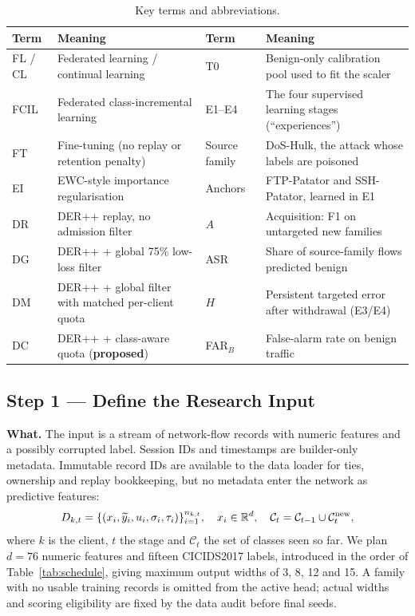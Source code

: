 \documentclass[10pt,a4paper]{article}
\begin{document}
\begin{table}[H]
\centering\footnotesize
\caption{Key terms and abbreviations.}
\label{tab:terms}
\begin{tabularx}{\linewidth}{L{2.2cm}Y L{2.2cm}Y}
\toprule
Term & Meaning & Term & Meaning\\
\midrule
FL / CL & Federated learning / continual learning & T0 & Benign-only calibration pool used to fit the scaler\\
FCIL & Federated class-incremental learning & E1--E4 & The four supervised learning stages (\enquote{experiences})\\
FT & Fine-tuning (no replay or retention penalty) & Source family & DoS-Hulk, the attack whose labels are poisoned\\
EI & EWC-style importance regularisation & Anchors & FTP-Patator and SSH-Patator, learned in E1\\
DR & DER++ replay, no admission filter & $A$ & Acquisition: F1 on untargeted new families\\
DG & DER++ + global 75\% low-loss filter & ASR & Share of source-family flows predicted benign\\
DM & DER++ + global filter with matched per-client quota & $H$ & Persistent targeted error after withdrawal (E3/E4)\\
DC & DER++ + class-aware quota (\textbf{proposed}) & FAR$_B$ & False-alarm rate on benign traffic\\
\bottomrule
\end{tabularx}
\end{table}

\subsection{Step 1 --- Define the Research Input}
\textbf{What.} The input is a stream of network-flow records with numeric features and a possibly corrupted label. Session IDs and timestamps are builder-only metadata. Immutable record IDs are available to the data loader for ties, ownership and replay bookkeeping, but no metadata enter the network as predictive features:
\begin{equation}
D_{k,t}=\{(x_i,\widetilde y_i,u_i,\sigma_i,\tau_i)\}_{i=1}^{n_{k,t}},\quad
x_i\in\mathbb R^d,\quad\mathcal C_t=\mathcal C_{t-1}\cup\mathcal C_t^{\rm new},
\label{eq:input}
\end{equation}
where $k$ is the client, $t$ the stage and $\mathcal C_t$ the set of classes seen so far. We plan $d=76$ numeric features and fifteen CICIDS2017 labels, introduced in the order of Table~\ref{tab:schedule}, giving maximum output widths of 3, 8, 12 and 15. A family with no usable training records is omitted from the active head; actual widths and scoring eligibility are fixed by the data audit before final seeds.
\end{document}
